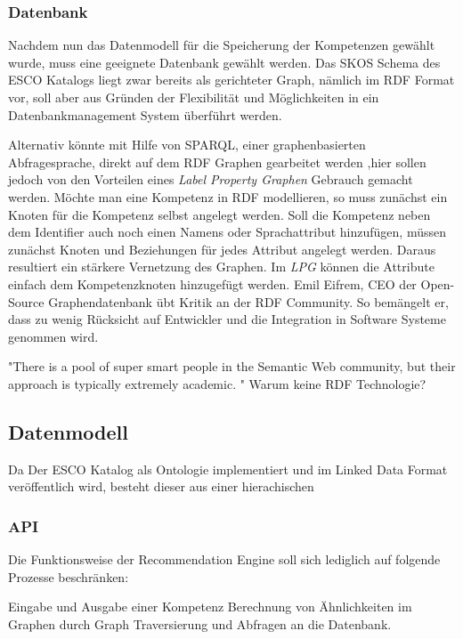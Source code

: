 \subsubsection{Datenbank}

Nachdem nun das Datenmodell für die Speicherung der Kompetenzen gewählt wurde, muss eine geeignete Datenbank gewählt werden. Das SKOS Schema des ESCO Katalogs liegt zwar bereits als gerichteter Graph, nämlich im RDF Format vor, soll aber aus Gründen der Flexibilität und Möglichkeiten in ein Datenbankmanagement System überführt werden.

Alternativ könnte mit Hilfe von SPARQL, einer graphenbasierten Abfragesprache, direkt auf dem RDF Graphen gearbeitet werden 
,hier sollen jedoch von den Vorteilen eines \textit{Label Property Graphen}  Gebrauch gemacht werden. Möchte man eine Kompetenz in RDF modellieren, so muss zunächst ein Knoten für die Kompetenz selbst angelegt werden. Soll die Kompetenz neben dem Identifier auch noch einen Namens oder Sprachattribut hinzufügen, müssen zunächst Knoten und Beziehungen für jedes Attribut angelegt werden. Daraus resultiert ein stärkere Vernetzung des Graphen. Im \textit{LPG} können die Attribute einfach dem Kompetenzknoten hinzugefügt werden. Emil Eifrem, CEO der Open-Source Graphendatenbank \cite{Neo4j} übt Kritik an der RDF Community. So bemängelt er, dass zu wenig Rücksicht auf Entwickler und die Integration in Software Systeme genommen wird. \cite{anadiotis_2017} 

"There is a pool of super smart people in the Semantic Web community, but their approach is typically extremely academic. "
Warum keine RDF Technologie?

\subsection{Datenmodell}

Da Der ESCO Katalog als Ontologie implementiert und im Linked Data Format veröffentlich wird, besteht dieser aus einer hierachischen 


\subsubsection{API}

 Die Funktionsweise der Recommendation Engine soll sich lediglich auf folgende Prozesse beschränken:
 
 Eingabe und Ausgabe einer Kompetenz
Berechnung von Ähnlichkeiten im Graphen durch Graph Traversierung und Abfragen an die Datenbank.

